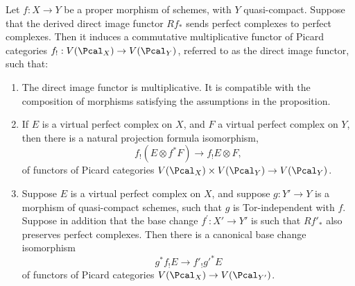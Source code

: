 \begin{proposition}\label{prop:properties-direct-image-virtual}
Let $f: X\to Y$ be a proper morphism of schemes, with $Y$ quasi-compact. Suppose that the derived direct image functor $Rf_\ast$ sends perfect complexes to perfect complexes. Then it induces a commutative multiplicative functor of Picard categories $f_!: V(\Pcal_X) \to V(\Pcal_Y)$, referred to as the direct image functor, such that:
\begin{enumerate}
\item\label{item:properties-direct-image-virtual-1} The direct image functor is multiplicative. It is compatible with the composition of morphisms satisfying the assumptions in the proposition.
\item\label{item:properties-direct-image-virtual-2} If $E$ is a virtual perfect complex on $X$, and $F$ a virtual perfect complex on $Y$, then there is a natural projection formula isomorphism,
\begin{displaymath}
f_! \left(E \otimes f^\ast F\right)\to f_! E \otimes F,
\end{displaymath}
of functors of Picard categories $V(\Pcal_X) \times V(\Pcal_Y) \to V(\Pcal_Y)$.
\item\label{item:properties-direct-image-virtual-3} Suppose $E$ is a virtual perfect complex on $X$, and suppose $g \colon Y' \to Y$ is a morphism of quasi-compact schemes, such that $g$ is Tor-independent with $f$. Suppose in addition that the base change $f^\prime \colon X' \to Y'$ is such that $R{f'}_\ast$ also preserves perfect complexes. Then there is a canonical base change isomorphism
\begin{displaymath}
g^\ast f_! E \to f'_! {g'}^\ast E
\end{displaymath}
of functors of Picard categories $V(\Pcal_X) \to V(\Pcal_{Y'})$.
\end{enumerate}
\end{proposition}


